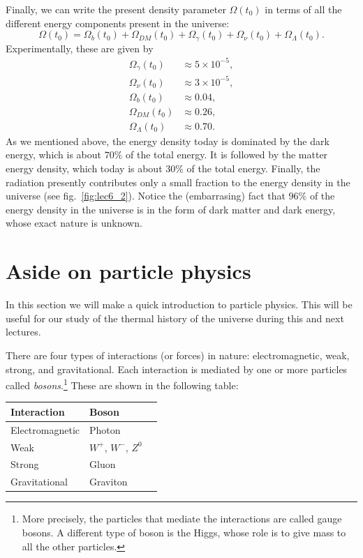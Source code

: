 Finally, we can write the present density parameter $\Omega(t_0)$ in terms of all the different energy components present in the universe:
\begin{equation}
\Omega(t_0)=\Omega_b(t_0)+\Omega_{DM}(t_0)+\Omega_{\gamma}(t_0)+\Omega_{\nu}(t_0)+\Omega_{\Lambda}(t_0).
\end{equation}
Experimentally, these are given by
\begin{equation}
\begin{split}
\Omega_{\gamma}(t_0)&\approx 5\times10^{-5},\\
\Omega_{\nu}(t_0)&\approx 3\times10^{-5},\\
\Omega_{b}(t_0)&\approx 0.04,\\
\Omega_{DM}(t_0)&\approx 0.26,\\
\Omega_{\Lambda}(t_0)&\approx 0.70.
\end{split}
\end{equation}
As we mentioned above, the energy density today is dominated by the dark energy, which is about $70\%$ of the total energy. It is followed by the matter energy density, which today is about $30\%$ of the total energy. Finally, the radiation presently contributes only a small fraction to the energy density in the universe (see fig.\ \ref{fig:lec6_2}). Notice the (embarrasing) fact that $96\%$ of the energy density in the universe is in the form of dark matter and dark energy, whose exact nature is unknown.

\section{Aside on particle physics}

In this section we will make a quick introduction to particle physics. This will be useful for our study of the thermal history of the universe during this and next lectures.

There are four types of interactions (or forces) in nature: electromagnetic, weak, strong, and gravitational. Each interaction is mediated by one or more particles called {\it bosons}.\footnote{More precisely, the particles that mediate the interactions are called gauge bosons. A different type of boson is the Higgs, whose role is to give mass to all the other particles.} These are shown in the following table:
\begin{table}[ht]
\begin{center}
\begin{tabular}{p{4cm} l l} \hline\hline
Interaction & Boson  \\ \hline
Electromagnetic & Photon \\
Weak & $W^{+}$, $W^{-}$, $Z^0$ \\
Strong & Gluon \\
Gravitational & Graviton \\ \hline\hline
\end{tabular}
\end{center}
\end{table}

